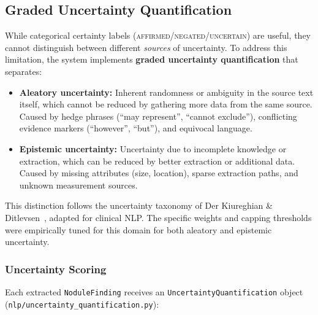 \documentclass[12pt]{article}
\begin{document}
\subsection{Graded Uncertainty Quantification}
\label{subsec:graded-uncertainty}

While categorical certainty labels (\textsc{affirmed}/\textsc{negated}/\textsc{uncertain}) are useful, they cannot distinguish between different \emph{sources} of uncertainty. To address this limitation, the system implements \textbf{graded uncertainty quantification} that separates:

\begin{itemize}
    \item \textbf{Aleatory uncertainty:} Inherent randomness or ambiguity in the source text itself, which cannot be reduced by gathering more data from the same source. Caused by hedge phrases (``may represent'', ``cannot exclude''), conflicting evidence markers (``however'', ``but''), and equivocal language.
    \item \textbf{Epistemic uncertainty:} Uncertainty due to incomplete knowledge or extraction, which can be reduced by better extraction or additional data. Caused by missing attributes (size, location), sparse extraction paths, and unknown measurement sources.
\end{itemize}

This distinction follows the uncertainty taxonomy of Der Kiureghian \& Ditlevsen~\cite{kiureghian2009aleatory}, adapted for clinical NLP. The specific weights and capping thresholds were empirically tuned for this domain for both aleatory and epistemic uncertainty.

\subsubsection{Uncertainty Scoring}

Each extracted \texttt{NoduleFinding} receives an \texttt{UncertaintyQuantification} object (\texttt{nlp/uncertainty\_quantification.py}):
\end{document}
